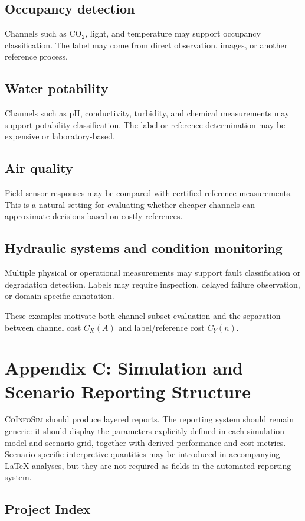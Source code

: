 \documentclass[11pt,a4paper]{article}
\newcommand{\CoInfoSim}{\textsc{CoInfoSim}}
\begin{document}
\subsection*{Occupancy detection}
Channels such as CO$_2$, light, and temperature may support occupancy classification. The label may come from direct observation, images, or another reference process.

\subsection*{Water potability}
Channels such as pH, conductivity, turbidity, and chemical measurements may support potability classification. The label or reference determination may be expensive or laboratory-based.

\subsection*{Air quality}
Field sensor responses may be compared with certified reference measurements. This is a natural setting for evaluating whether cheaper channels can approximate decisions based on costly references.

\subsection*{Hydraulic systems and condition monitoring}
Multiple physical or operational measurements may support fault classification or degradation detection. Labels may require inspection, delayed failure observation, or domain-specific annotation.

These examples motivate both channel-subset evaluation and the separation between channel cost $C_X(A)$ and label/reference cost $C_Y(n)$.

\section{Appendix C: Simulation and Scenario Reporting Structure}

\CoInfoSim{} should produce layered reports. The reporting system should remain generic: it should display the parameters explicitly defined in each simulation model and scenario grid, together with derived performance and cost metrics. Scenario-specific interpretive quantities may be introduced in accompanying LaTeX analyses, but they are not required as fields in the automated reporting system.

\subsection{Project Index}
\end{document}
